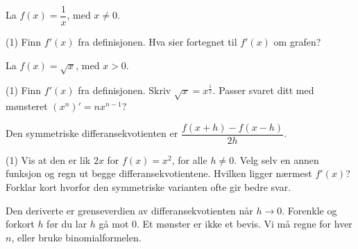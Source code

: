 La $f(x) = \dfrac{1}{x}$, med $x \neq 0$.
\begin{tasks}(1)
  \task Finn $f'(x)$ fra definisjonen.
  \task Hva sier fortegnet til $f'(x)$ om grafen?
\end{tasks}

La $f(x) = \sqrt{x}$, med $x > 0$.
\begin{tasks}(1)
  \task Finn $f'(x)$ fra definisjonen.
  \task Skriv $\sqrt{x} = x^{\tfrac{1}{2}}$. Passer svaret ditt med mønsteret $(x^n)' = nx^{n-1}$?
\end{tasks}

Den symmetriske differansekvotienten er $\dfrac{f(x + h) - f(x - h)}{2h}$.
\begin{tasks}(1)
  \task Vis at den er lik $2x$ for $f(x) = x^2$, for alle $h \neq 0$.
  \task Velg selv en annen funksjon og regn ut begge differansekvotientene. Hvilken ligger nærmest $f'(x)$?
  \task Forklar kort hvorfor den symmetriske varianten ofte gir bedre svar.
\end{tasks}

\begin{oppsummering}
Den deriverte er grenseverdien av differansekvotienten når $h \to 0$. Forenkle og forkort $h$ før du lar $h$ gå mot 0.
Et mønster er ikke et bevis. Vi må regne for hver $n$, eller bruke binomialformelen.
\end{oppsummering}
